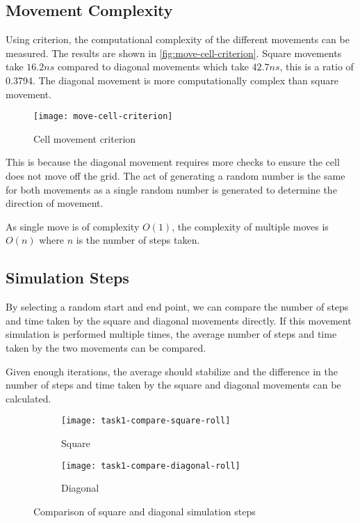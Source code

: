 \subsection{Movement Complexity}

Using criterion, the computational complexity of the different movements can be measured.
The results are shown in \autoref{fig:move-cell-criterion}.
Square movements take $16.2ns$ compared to diagonal movements which take $42.7ns$, this is a ratio of 0.3794.
The diagonal movement is more computationally complex than square movement.

\begin{figure}[ht]
    \centering
    \texttt{[image: move-cell-criterion]}
    \caption[Cell movement criterion]{Cell movement criterion}
    \label{fig:move-cell-criterion}
\end{figure}


This is because the diagonal movement requires more checks to ensure the cell does not move off the grid.
The act of generating a random number is the same for both movements as a single random number is generated to determine the direction of movement.

As single move is of complexity $O(1)$, the complexity of multiple moves is $O(n)$ where $n$ is the number of steps taken.

\clearpage

\subsection{Simulation Steps}

By selecting a random start and end point, we can compare the number of steps and time taken by the square and diagonal movements directly.
If this movement simulation is performed multiple times, the average number of steps and time taken by the two movements can be compared.

Given enough iterations, the average should stabilize and the difference in the number of steps and time taken by the square and diagonal movements can be calculated.

\begin{figure}[ht]
    \centering
    \begin{subfigure}{\textwidth}
        \texttt{[image: task1-compare-square-roll]}
        \caption[Square]{Square}
        \label{fig:task1-compare-square-roll}
    \end{subfigure}

    \begin{subfigure}{\textwidth}
        \texttt{[image: task1-compare-diagonal-roll]}
        \caption[Diagonal]{Diagonal}
        \label{fig:task1-compare-diagonal-roll}
    \end{subfigure}

    \caption[Comparison of square and diagonal simulation steps]{Comparison of square and diagonal simulation steps}
    \label{fig:task1-compare-roll}
\end{figure}

